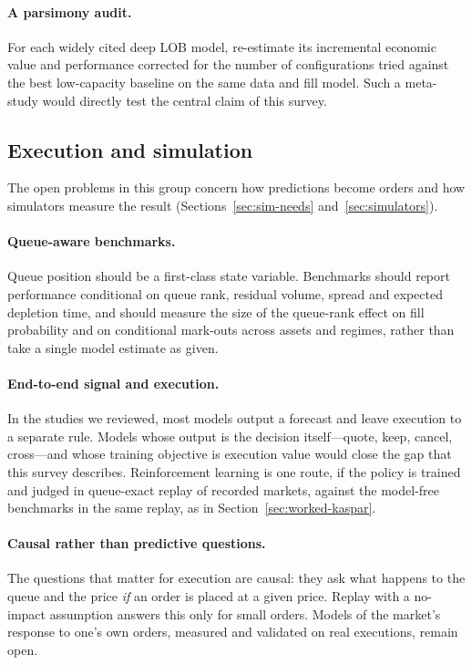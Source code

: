 \paragraph{A parsimony audit.} For each widely cited deep LOB model, re-estimate its incremental
economic value and performance corrected for the number of configurations tried against the best low-capacity baseline on the same data and
fill model. Such a meta-study would directly test the central claim of this survey.

\subsection{Execution and simulation}

The open problems in this group concern how predictions become orders and how simulators measure the result
(Sections~\ref{sec:sim-needs} and~\ref{sec:simulators}).

\paragraph{Queue-aware benchmarks.} Queue position should be a first-class state variable.
Benchmarks should report performance conditional on queue rank, residual volume, spread and expected
depletion time, and should measure the size of the queue-rank effect on fill probability and on
conditional mark-outs across assets and regimes, rather than take a single model estimate as
given.

\paragraph{End-to-end signal and execution.} In the studies we reviewed, most models output a forecast
and leave execution to a separate rule. Models whose output is the decision itself---quote, keep, cancel, cross---and whose
training objective is execution value would close the gap that this survey describes. Reinforcement
learning is one route, if the policy is trained and judged in queue-exact replay of recorded markets, against the
model-free benchmarks in the same replay, as in Section~\ref{sec:worked-kaspar}.

\paragraph{Causal rather than predictive questions.} The questions that matter for execution are
causal: they ask what happens to the queue and the price \emph{if} an order is placed at a given price. Replay with a
no-impact assumption answers this only for small orders. Models of the market's response to one's own
orders, measured and validated on real executions, remain open.

